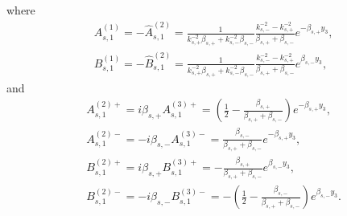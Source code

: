 \documentclass[final,reqno]{siamltex}
\begin{document}
where 
\begin{align*}
  &A_{s,1}^{(1)}=-\hat A_{s,1}^{(2)}=\frac{1}{k_{s,+}^{-2}\beta_{s,+}+k_{s,-}^{-2}\beta_{s,-}}\frac{k_{s,-}^{-2}-k_{s,+}^{-2}}{\beta_{s,+}+\beta_{s,-}}e^{-\beta_{s,+}y_3}, \\
  &B_{s,1}^{(1)}=-\hat B_{s,1}^{(2)}=\frac{1}{k_{s,+}^{-2}\beta_{s,+}+k_{s,-}^{-2}\beta_{s,-}}\frac{k_{s,-}^{-2}-k_{s,+}^{-2}}{\beta_{s,+}+\beta_{s,-}}e^{\beta_{s,-}y_3}, 
\end{align*}
and 
\begin{align*}
  &A_{s,1}^{(2)+}=i\beta_{s,+}A_{s,1}^{(3)+}=\left(\frac{1}{2}-\frac{\beta_{s,+}}{\beta_{s,+}+\beta_{s,-}}\right)e^{-\beta_{s,+}y_3}, \\
  &A_{s,1}^{(2)-}=-i\beta_{s,-}A_{s,1}^{(3)-}=\frac{\beta_{s,-}}{\beta_{s,+}+\beta_{s,-}}e^{-\beta_{s,+}y_3}, \\
  &B_{s,1}^{(2)+}=i\beta_{s,+}B_{s,1}^{(3)+}=-\frac{\beta_{s,+}}{\beta_{s,+}+\beta_{s,-}}e^{\beta_{s,-}y_3}, \\
  &B_{s,1}^{(2)-}=-i\beta_{s,-}B_{s,1}^{(3)-}=-\left(\frac{1}{2}-\frac{\beta_{s,-}}{\beta_{s,+}+\beta_{s,-}}\right)e^{\beta_{s,-}y_3}. 
\end{align*}
\end{document}

